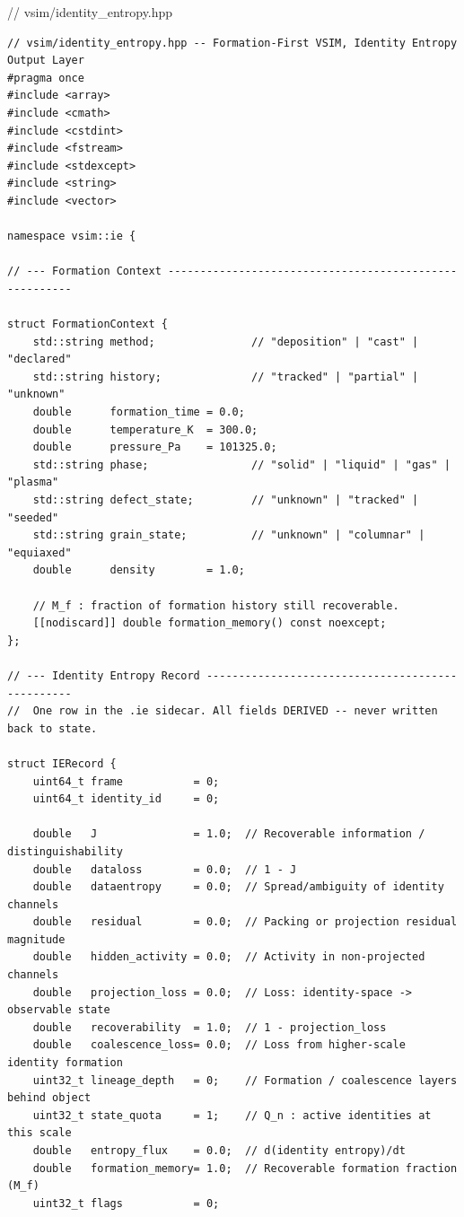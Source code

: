 \documentclass[11pt,a4paper]{article}
\begin{document}
\vspace{8pt}
\begin{cppfilelabel}
\textcolor{cpptype}{\ttfamily\small // vsim/identity\_entropy.hpp}
\end{cppfilelabel}
\begin{lstlisting}[style=cppstyle]
// vsim/identity_entropy.hpp -- Formation-First VSIM, Identity Entropy Output Layer
#pragma once
#include <array>
#include <cmath>
#include <cstdint>
#include <fstream>
#include <stdexcept>
#include <string>
#include <vector>

namespace vsim::ie {

// --- Formation Context -------------------------------------------------------

struct FormationContext {
    std::string method;               // "deposition" | "cast" | "declared"
    std::string history;              // "tracked" | "partial" | "unknown"
    double      formation_time = 0.0;
    double      temperature_K  = 300.0;
    double      pressure_Pa    = 101325.0;
    std::string phase;                // "solid" | "liquid" | "gas" | "plasma"
    std::string defect_state;         // "unknown" | "tracked" | "seeded"
    std::string grain_state;          // "unknown" | "columnar" | "equiaxed"
    double      density        = 1.0;

    // M_f : fraction of formation history still recoverable.
    [[nodiscard]] double formation_memory() const noexcept;
};

// --- Identity Entropy Record -------------------------------------------------
//  One row in the .ie sidecar. All fields DERIVED -- never written back to state.

struct IERecord {
    uint64_t frame           = 0;
    uint64_t identity_id     = 0;

    double   J               = 1.0;  // Recoverable information / distinguishability
    double   dataloss        = 0.0;  // 1 - J
    double   dataentropy     = 0.0;  // Spread/ambiguity of identity channels
    double   residual        = 0.0;  // Packing or projection residual magnitude
    double   hidden_activity = 0.0;  // Activity in non-projected channels
    double   projection_loss = 0.0;  // Loss: identity-space -> observable state
    double   recoverability  = 1.0;  // 1 - projection_loss
    double   coalescence_loss= 0.0;  // Loss from higher-scale identity formation
    uint32_t lineage_depth   = 0;    // Formation / coalescence layers behind object
    uint32_t state_quota     = 1;    // Q_n : active identities at this scale
    double   entropy_flux    = 0.0;  // d(identity entropy)/dt
    double   formation_memory= 1.0;  // Recoverable formation fraction  (M_f)
    uint32_t flags           = 0;


\end{lstlisting}
\end{document}
